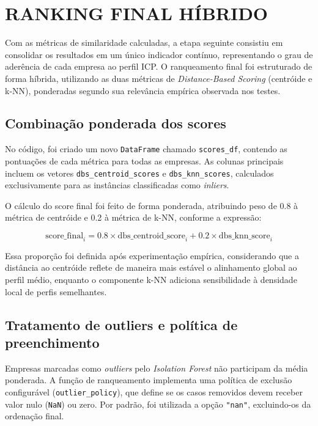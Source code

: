\section{RANKING FINAL HÍBRIDO}

Com as métricas de similaridade calculadas, a etapa seguinte consistiu em consolidar os resultados em um único indicador contínuo, representando o grau de aderência de cada empresa ao perfil ICP. O ranqueamento final foi estruturado de forma híbrida, utilizando as duas métricas de \textit{Distance-Based Scoring} (centróide e k-NN), ponderadas segundo sua relevância empírica observada nos testes.

\subsection{Combinação ponderada dos scores}

No código, foi criado um novo \texttt{DataFrame} chamado \texttt{scores\_df}, contendo as pontuações de cada métrica para todas as empresas. As colunas principais incluem os vetores \texttt{dbs\_centroid\_scores} e \texttt{dbs\_knn\_scores}, calculados exclusivamente para as instâncias classificadas como \textit{inliers}. 

O cálculo do score final foi feito de forma ponderada, atribuindo peso de 0.8 à métrica de centróide e 0.2 à métrica de k-NN, conforme a expressão:

\[
\text{score\_final}_i = 0.8 \times \text{dbs\_centroid\_score}_i + 0.2 \times \text{dbs\_knn\_score}_i
\]

Essa proporção foi definida após experimentação empírica, considerando que a distância ao centróide reflete de maneira mais estável o alinhamento global ao perfil médio, enquanto o componente k-NN adiciona sensibilidade à densidade local de perfis semelhantes.

\subsection{Tratamento de outliers e política de preenchimento}

Empresas marcadas como \textit{outliers} pelo \textit{Isolation Forest} não participam da média ponderada. A função de ranqueamento implementa uma política de exclusão configurável (\texttt{outlier\_policy}), que define se os casos removidos devem receber valor nulo (\texttt{NaN}) ou zero. Por padrão, foi utilizada a opção \texttt{"nan"}, excluindo-os da ordenação final.

